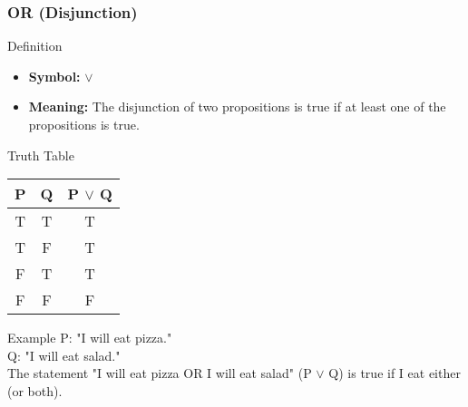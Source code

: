 \documentclass[aspectratio=169]{beamer}
\begin{document}
\begin{frame}[fragile]
    \frametitle{OR (Disjunction)}
    \begin{block}{Definition}
        \begin{itemize}
            \item \textbf{Symbol:} $\lor$
            \item \textbf{Meaning:} The disjunction of two propositions is true if at least one of the propositions is true.
        \end{itemize}
    \end{block}
    \begin{block}{Truth Table}
        \begin{center}
            \begin{tabular}{|c|c|c|}
                \hline
                P & Q & P $\lor$ Q \\
                \hline
                T & T & T \\
                T & F & T \\
                F & T & T \\
                F & F & F \\
                \hline
            \end{tabular}
        \end{center}
    \end{block}
    \begin{block}{Example}
        P: "I will eat pizza." \\
        Q: "I will eat salad." \\
        The statement "I will eat pizza OR I will eat salad" (P $\lor$ Q) is true if I eat either (or both).
    \end{block}
\end{frame}
\end{document}
